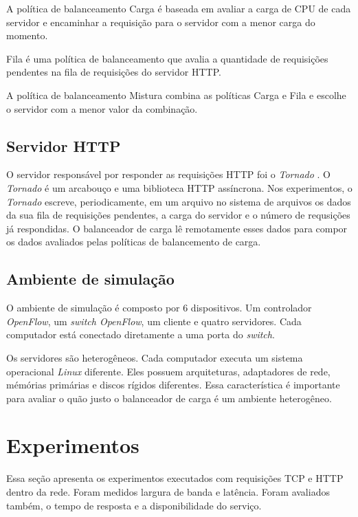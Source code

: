 A política de balanceamento Carga é baseada em avaliar a carga de CPU 
de cada servidor e encaminhar a requisição para o servidor com a menor 
carga do momento.
    
Fila é uma política de balanceamento que avalia a quantidade de requisições
pendentes na fila de requisições do servidor HTTP.
    
A política de balanceamento Mistura combina as políticas Carga e Fila 
e escolhe o servidor com a menor valor da combinação.

\subsection{Servidor HTTP}

O servidor responsável por responder as requisições HTTP foi o 
\emph{Tornado} \citep{tornado}.
O \emph{Tornado} é um arcabouço e uma biblioteca HTTP assíncrona.
Nos experimentos, o \emph{Tornado} escreve, periodicamente, em um arquivo 
no sistema de arquivos os dados da sua fila de requisições pendentes,
a carga do servidor e o número de requsições já respondidas.
O balanceador de carga lê remotamente esses dados para compor os 
dados avaliados pelas políticas de balancemento de carga.

\subsection{Ambiente de simulação}

O ambiente de simulação é composto por 6 dispositivos.
Um controlador \emph{OpenFlow}, um \emph{switch OpenFlow}, um 
cliente e quatro servidores.
Cada computador está conectado diretamente a uma porta do \emph{switch}.

Os servidores são heterogêneos.
Cada computador executa um sistema operacional \emph{Linux} diferente.
Eles possuem arquiteturas, adaptadores de rede, mémórias primárias
e discos rígidos diferentes.
Essa característica é importante para avaliar o quão justo o balanceador 
de carga é um ambiente heterogêneo.

\section{Experimentos}

Essa seção apresenta os experimentos executados com requisições TCP e HTTP
dentro da rede.
Foram medidos largura de banda e latência.
Foram avaliados também, o tempo de resposta e a disponibilidade do serviço.

